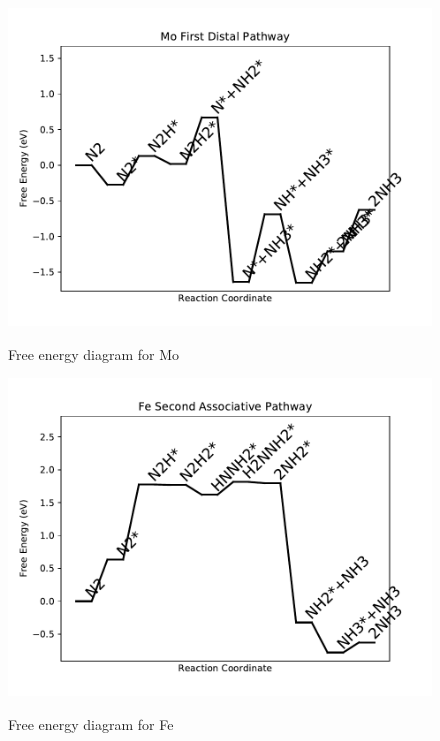 \documentclass{article}
\begin{document}
\newpage
\begin{figure}
\includegraphics[width=1\linewidth]{data/plots/Mo_distal_1.pdf}
\label{fig:Mo_distal_1}
\caption{Free energy diagram for Mo}
\end{figure}

\begin{figure}
\includegraphics[width=1\linewidth]{data/plots/Fe_associative_2.pdf}
\label{fig:Fe_associative_2}
\caption{Free energy diagram for Fe}
\end{figure}
\end{document}
